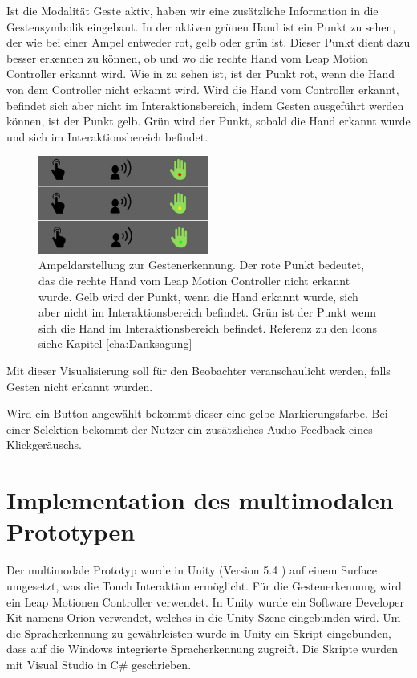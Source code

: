 Ist die Modalität Geste aktiv, haben wir eine zusätzliche Information in die Gestensymbolik eingebaut. 
In der aktiven grünen Hand ist ein Punkt zu sehen, der wie bei einer Ampel entweder rot, gelb oder grün ist. 
Dieser Punkt dient dazu besser erkennen zu können, ob und wo die rechte Hand vom Leap Motion Controller erkannt wird. 
Wie in  zu sehen ist, ist der Punkt rot, wenn die Hand von dem Controller nicht erkannt wird. 
Wird die Hand vom Controller erkannt, befindet sich aber nicht im Interaktionsbereich, indem Gesten ausgeführt werden können, ist der Punkt gelb.
Grün wird der Punkt, sobald die Hand erkannt wurde und sich im Interaktionsbereich befindet.
\begin{figure}[ht]
  \centering
  \includegraphics[width=0.5\textwidth]{img/Gestenerkennung.jpg}
  \caption[Ampeldarstellung zur Gestenerkennung]{Ampeldarstellung zur Gestenerkennung. Der rote Punkt bedeutet, das die rechte Hand vom Leap Motion Controller nicht erkannt wurde. 
	Gelb wird der Punkt, wenn die Hand erkannt wurde, sich aber nicht im Interaktionsbereich befindet. 
	Grün ist der Punkt wenn sich die Hand im Interaktionsbereich befindet. Referenz zu den Icons siehe Kapitel \ref{cha:Danksagung}}
  \label{fig:Ampeldarstellung}
\end{figure} 
Mit dieser Visualisierung soll für den Beobachter veranschaulicht werden, falls Gesten nicht erkannt wurden. 

Wird ein Button angewählt bekommt dieser eine gelbe Markierungsfarbe. 
Bei einer Selektion bekommt der Nutzer ein zusätzliches Audio Feedback eines Klickgeräuschs.

\section[Implementation]{Implementation des multimodalen Prototypen}
Der multimodale Prototyp wurde in Unity (Version 5.4 \citep{Unity}) auf einem Surface umgesetzt, was die Touch Interaktion ermöglicht. 
Für die Gestenerkennung wird ein Leap Motionen Controller \citep{Leap} verwendet. 
In Unity wurde ein Software Developer Kit namens Orion \citep{OrionBeta} verwendet, welches in die Unity Szene eingebunden wird. 
Um die Spracherkennung zu gewährleisten wurde in Unity ein Skript eingebunden, dass auf die Windows integrierte Spracherkennung zugreift. 
Die Skripte wurden mit Visual Studio in C\# geschrieben.

